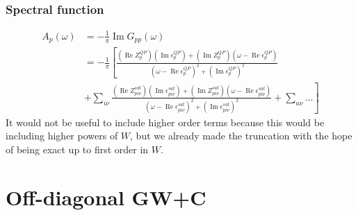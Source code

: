 \begin{frame}
    \frametitle{Spectral function}
\begin{align}
    A_{p}(\omega) &= -\frac{1}{\pi} \operatorname{Im} G_{pp}(\omega) \\
&=-\frac{1}{\pi}\left[\frac{\left(\operatorname{Re} Z_p^{QP}\right)\left(\operatorname{Im} \epsilon_p^{QP}\right) + \left(\operatorname{Im} Z_p^{QP}\right)\left(\omega - \operatorname{Re} \epsilon_p^{QP}\right)}{\left(\omega - \operatorname{Re} \epsilon_p^{QP}\right)^2 + \left(\operatorname{Im} \epsilon_p^{QP}\right)^2}\right.\\
& \left. + \sum_{i\nu} \frac{\left(\operatorname{Re} Z_{pi\nu}^{sat}\right)\left(\operatorname{Im} \epsilon_{pi\nu}^{sat}\right) + \left(\operatorname{Im} Z_{pi\nu}^{sat}\right)\left(\omega - \operatorname{Re} \epsilon_{pi\nu}^{sat}\right)}{\left(\omega - \operatorname{Re} \epsilon_{pi\nu}^{sat}\right)^2 + \left(\operatorname{Im} \epsilon_{pi\nu}^{sat}\right)^2} + \sum_{a\nu}\ldots \right]
\end{align}
\color{orange}
It would not be useful to include higher order terms because this would be including higher powers of $W$, but we already made the truncation with the hope of being exact up to first order in $W$.
\end{frame}
\section{Off-diagonal GW+C}




